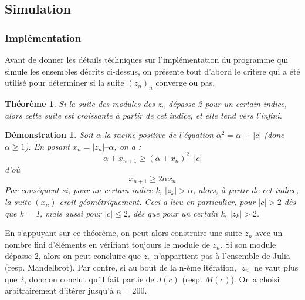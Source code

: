 \documentclass{article}
\newtheorem{theoreme}{Théorème}[section]
\newtheorem{demonstration}{Démonstration} [section]
\theoremstyle{definition}
\newtheorem{definition}{Définition} [section]
\begin{document}


 
\subsection{Simulation}

\subsubsection{Implémentation}

Avant de donner les détails téchniques sur l'implémentation du programme qui
simule les ensembles décrits ci-dessus, on présente tout d'abord le critère qui
a été utilisé pour déterminer si la suite \((z_n)_n\) converge ou pas. 

\begin{theoreme}

Si la suite des modules des \(z_n\) dépasse 2 pour un certain indice, alors
cette suite est croissante à partir de cet indice, et elle tend vers l'infini.

\end{theoreme}

\begin{demonstration}

Soit \(\alpha\) la racine positive de l'équation \(\alpha^2 = \alpha~ + |c|\)
(donc \(\alpha \geq 1\)). En posant \(x_n = | z_n |  – \alpha\), on a
:
\[\alpha + x_{n+1} \geq (\alpha + x_n)^2 – |c|\]
d'où 
\[x_{n+1} \geq 2\alpha x_n\]
Par conséquent si, pour un certain indice k, \(|z_k| > \alpha\), alors, à
partir de cet indice, la suite \((x_n)\) croît géométriquement.
Ceci a lieu en particulier, pour \(|c| > 2\) dès que k = 1, mais aussi pour
\(|c| \leq 2\), dès que pour un certain k, \(|z_k| > 2\).

\end{demonstration}

En s'appuyant sur ce théorème, on peut alors construire une suite \(z_n\) avec
un nombre fini d'éléments en vérifiant toujours le module de \(z_n\). Si
son module dépasse 2, alors on peut concluire que \(z_n\) n'appartient pas à
l'ensemble de Julia (resp. Mandelbrot). Par contre, si au bout de la n-ème
itération, \(|z_n|\) ne vaut plus que 2, donc on conclut qu'il fait partie de
\(J(c)\) (resp. \(M(c)\)). On a choisi arbitrairement d'itérer jusqu'à
\(n=200\).
\end{document}
